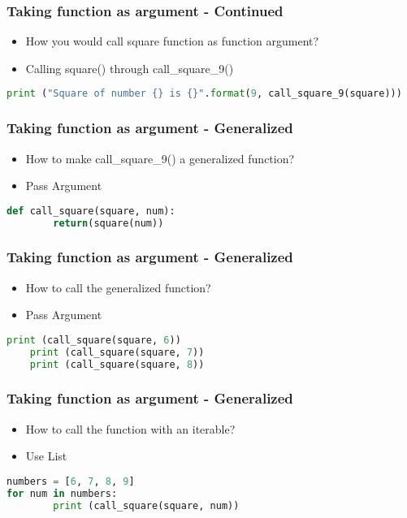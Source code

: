 \documentclass[14pt]{beamer}
\begin{document}
    \begin{frame}[containsverbatim]
        \frametitle{Taking function as argument - Continued}
        \begin{itemize}
		\item How you would call square function as function argument?
        \item \alert {Calling square() through call\_square\_9()}
        \end{itemize}
        \begin{lstlisting}[language=Python]
	print ("Square of number {} is {}".format(9, call_square_9(square)))
        \end{lstlisting}
    \end{frame}

    \begin{frame}[containsverbatim]
        \frametitle{Taking function as argument - Generalized}
        \begin{itemize}
		\item How to make call\_square\_9() a generalized function?
        \item \alert {Pass Argument}
        \end{itemize}
        \begin{lstlisting}[language=Python]
def call_square(square, num):
        return(square(num))
        \end{lstlisting}
    \end{frame}

    \begin{frame}[containsverbatim]
        \frametitle{Taking function as argument - Generalized}
        \begin{itemize}
		\item How to call the generalized function?
        \item \alert {Pass Argument}
        \end{itemize}
        \begin{lstlisting}[language=Python]
	print (call_square(square, 6))
	print (call_square(square, 7))
	print (call_square(square, 8))
        \end{lstlisting}
    \end{frame}

    \begin{frame}[containsverbatim]
        \frametitle{Taking function as argument - Generalized}
        \begin{itemize}
		\item How to call the function with an iterable?
        \item \alert {Use List}
        \end{itemize}
        \begin{lstlisting}[language=Python]
numbers = [6, 7, 8, 9]
for num in numbers:
        print (call_square(square, num))
        \end{lstlisting}
    \end{frame}
\end{document}
